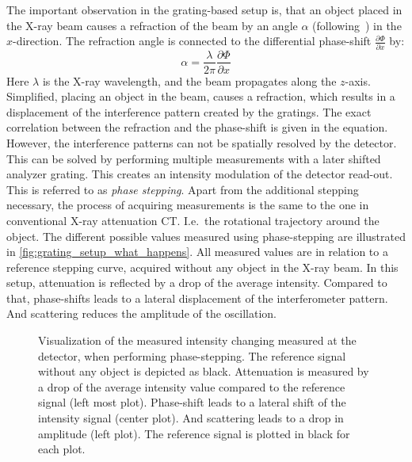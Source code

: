 The important observation in the grating-based setup is, that an object placed in the X-ray beam
causes a refraction of the beam by an angle \(\alpha\) (following~\cite{donath_inverse_2009}) in the
\(x\)-direction. The refraction angle is connected to the differential phase-shift \(\frac{\partial
	\Phi}{\partial x}\) by:
\begin{equation}
	\alpha = \frac{\lambda}{2 \pi} \frac{\partial \Phi}{\partial x}
\end{equation}
Here \(\lambda\) is the X-ray wavelength, and the beam propagates along the \(z\)-axis. Simplified,
placing an object in the beam, causes a refraction, which results in a displacement of the
interference pattern created by the gratings. The exact correlation between the refraction and the
phase-shift is given in the equation. However, the interference patterns can not be spatially
resolved by the detector. This can be solved by performing multiple measurements with a later
shifted analyzer grating. This creates an intensity modulation of the detector read-out. This is
referred to as \textit{phase stepping}. Apart from the additional stepping necessary, the process of
acquiring measurements is the same to the one in conventional X-ray attenuation CT\@. I.e.\ the
rotational trajectory around the object. The different possible values measured using phase-stepping
are illustrated in \autoref{fig:grating_setup_what_happens}. All measured values are in relation to
a reference stepping curve, acquired without any object in the X-ray beam. In this setup,
attenuation is reflected by a drop of the average intensity. Compared to that, phase-shifts leads to
a lateral displacement of the interferometer pattern. And scattering reduces the amplitude of the
oscillation.

\begin{figure}
	\centering
	\caption{Visualization of the measured intensity changing measured at the detector, when
                performing phase-stepping. The reference signal without any object is depicted as
                black. Attenuation is measured by a drop of the average intensity value compared to
                the reference signal (left most plot). Phase-shift leads to a lateral shift of the
                intensity signal (center plot). And scattering leads to a drop in amplitude (left
                plot). The reference signal is plotted in black for each plot.}%
	\label{fig:grating_setup_what_happens}
\end{figure}

